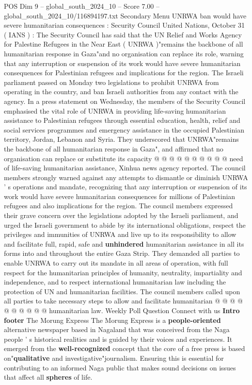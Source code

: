 \begin{textsample}{POS Dim 9 – global\_south\_2024\_10 – Score 7.00 – global\_south\_2024\_10/116894197.txt}  \label{ex:f9_pos_081}
Secondary Menu UNRWA ban would have severe humanitarian consequences : Security Council United Nations, October 31 ( IANS ) : The Security Council has said that the UN Relief and Works Agency for Palestine Refugees in the Near East ( UNRWA )"remains the backbone of all humanitarian response in Gaza"and no organisation can replace its role, warning that any interruption or suspension of its work would have severe humanitarian consequences for Palestinian refugees and implications for the region.
The Israeli parliament passed on Monday two legislations to prohibit UNRWA from operating in the country, and ban Israeli authorities from any contact with the agency.
In a press statement on Wednesday, the members of the Security Council emphasised the vital role of UNRWA in providing life-saving humanitarian assistance to Palestinian refugees through essential education, health, relief and social services programmes and emergency assistance in the occupied Palestinian territory, Jordan, Lebanon and Syria.
They underscored that UNRWA"remains the backbone of all humanitarian response in Gaza", and affirmed that no organisation can replace or substitute its capacity @ @ @ @ @ @ @ @ @ @ need of life-saving humanitarian assistance, Xinhua news agency reported.
The council members strongly warned against any attempts to dismantle or diminish UNRWA ' s operations and mandate, recognizing that any interruption or suspension of its work would have severe humanitarian consequences for millions of Palestinian refugees and also implications for the region.
The council members expressed their grave concern over the legislations adopted by the Israeli parliament, and urged the Israeli government to abide by its international obligations, respect the privileges and immunities of UNRWA and live up to its responsibility to allow and facilitate full, rapid, safe and \textbf{unhindered} humanitarian assistance in all its forms into and throughout the entire Gaza Strip.
They demanded all parties to enable UNRWA to carry out its mandate in all areas of operation, with full respect for the humanitarian principles of humanity, neutrality, impartiality and independence, and to respect international humanitarian law including the protection of UN and humanitarian facilities.
The council members called upon all parties to take necessary steps to allow and facilitate humanitarian @ @ @ @ @ @ @ @ @ @ humanitarian law.
Weekly Poll Question Connect with us \textbf{Intro} \textbf{footer} The Morung Express The Morung Express is a \textbf{people-oriented} alternative newspaper based in Nagaland that was conceived from the Naga people ' s historical realities and is guided by their voices and experiences.
It emerged from the \textbf{well-recognized} concept that the core of a free press is based on"\textbf{qualitative} and investigative"journalism.
Ensuring this is essential for contributing to an informed Naga public that makes sound decisions on issues that affect all \textbf{spheres} of life.

\end{textsample}
